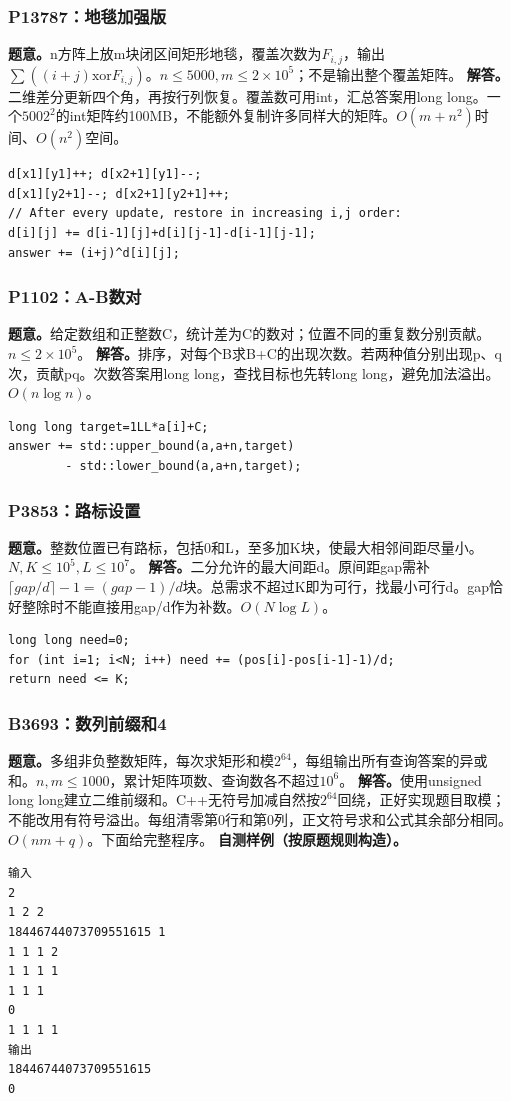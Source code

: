 \subsubsection{P13787：地毯加强版}
\textbf{题意。}n方阵上放m块闭区间矩形地毯，覆盖次数为$F_{i,j}$，输出$\sum((i+j)\mathbin{\mathrm{xor}}F_{i,j})$。$n\le5000,m\le2\times10^5$；不是输出整个覆盖矩阵。
\textbf{解答。}二维差分更新四个角，再按行列恢复。覆盖数可用int，汇总答案用long long。一个$5002^2$的int矩阵约100MB，不能额外复制许多同样大的矩阵。$O(m+n^2)$时间、$O(n^2)$空间。
\begin{lstlisting}
d[x1][y1]++; d[x2+1][y1]--;
d[x1][y2+1]--; d[x2+1][y2+1]++;
// After every update, restore in increasing i,j order:
d[i][j] += d[i-1][j]+d[i][j-1]-d[i-1][j-1];
answer += (i+j)^d[i][j];
\end{lstlisting}

\subsubsection{P1102：A-B数对}
\textbf{题意。}给定数组和正整数C，统计差为C的数对；位置不同的重复数分别贡献。$n\le2\times10^5$。
\textbf{解答。}排序，对每个B求B+C的出现次数。若两种值分别出现p、q次，贡献pq。次数答案用long long，查找目标也先转long long，避免加法溢出。$O(n\log n)$。
\begin{lstlisting}
long long target=1LL*a[i]+C;
answer += std::upper_bound(a,a+n,target)
        - std::lower_bound(a,a+n,target);
\end{lstlisting}

\subsubsection{P3853：路标设置}
\textbf{题意。}整数位置已有路标，包括0和L，至多加K块，使最大相邻间距尽量小。$N,K\le10^5,L\le10^7$。
\textbf{解答。}二分允许的最大间距d。原间距gap需补$\lceil gap/d\rceil-1=(gap-1)/d$块。总需求不超过K即为可行，找最小可行d。gap恰好整除时不能直接用gap/d作为补数。$O(N\log L)$。
\begin{lstlisting}
long long need=0;
for (int i=1; i<N; i++) need += (pos[i]-pos[i-1]-1)/d;
return need <= K;
\end{lstlisting}

\subsubsection{B3693：数列前缀和4}
\textbf{题意。}多组非负整数矩阵，每次求矩形和模$2^{64}$，每组输出所有查询答案的异或和。$n,m\le1000$，累计矩阵项数、查询数各不超过$10^6$。
\textbf{解答。}使用unsigned long long建立二维前缀和。C++无符号加减自然按$2^{64}$回绕，正好实现题目取模；不能改用有符号溢出。每组清零第0行和第0列，正文符号求和公式其余部分相同。$O(nm+q)$。下面给完整程序。
\textbf{自测样例（按原题规则构造）。}
\begin{verbatim}
输入
2
1 2 2
18446744073709551615 1
1 1 1 2
1 1 1 1
1 1 1
0
1 1 1 1
输出
18446744073709551615
0
\end{verbatim}

